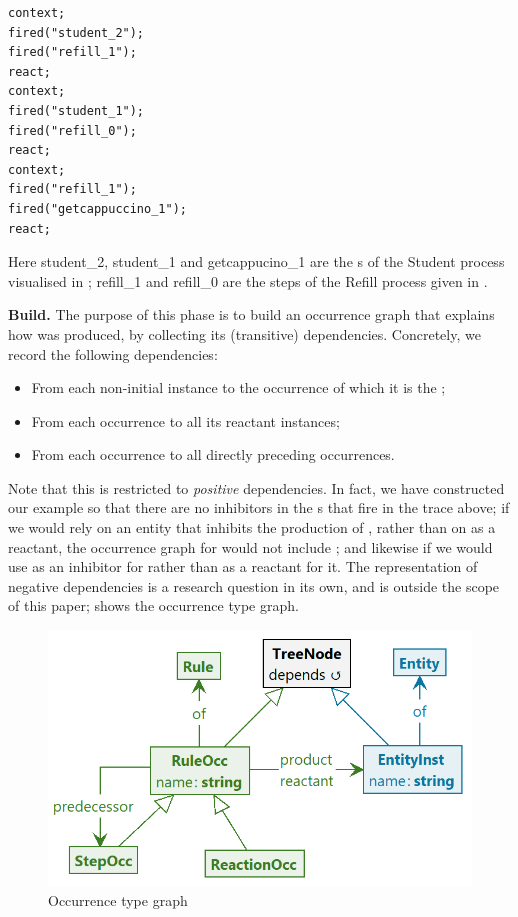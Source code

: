 \begin{center}
\begin{lstlisting}
context;
fired("student_2");
fired("refill_1");
react;
context;
fired("student_1");
fired("refill_0");
react;
context;
fired("refill_1");
fired("getcappuccino_1");
react;
\end{lstlisting}
\end{center}
%
Here \textsf{student\_2}, \textsf{student\_1} and \textsf{getcappucino\_1} are the \Step{}s of the \textsf{Student} process visualised in ; \textsf{refill\_1} and \textsf{refill\_0} are the steps of the \textsf{Refill} process given in .

\medskip\noindent\textbf{Build.}
%
The purpose of this phase is to build an occurrence graph that explains how \Forbidden was produced, by collecting its (transitive) dependencies. Concretely, we record the following dependencies:
\begin{itemize}
\item From each non-initial \Entity instance to the \Rule occurrence of which it is the \product;
\item From each \Rule occurrence to all its reactant \Entity instances;
\item From each \Step occurrence to all directly preceding \Step occurrences.
\end{itemize}
%
Note that this is restricted to \emph{positive} dependencies. In fact, we have constructed our example so that there are no inhibitors in the \Rule{}s that fire in the trace above; if we would rely on an entity \milk that inhibits the production of \espresso, rather than on \nomilk as a reactant, the occurrence graph for \bang would not include \milk; and likewise if we would use \cappuccino as an inhibitor for \anger rather than \espresso as a reactant for it. The representation of negative dependencies is a research question in its own, and is outside the scope of this paper;  shows the occurrence type graph. 

\begin{figure}
\centering
\includegraphics[scale=.2]{figs/occur-type}
\caption{Occurrence type graph}
\label{fig:occur-type}
\end{figure}

